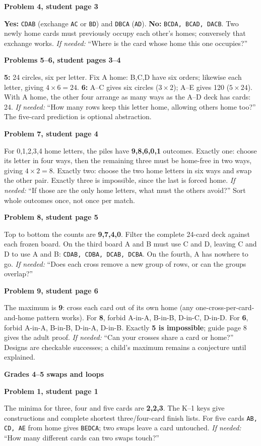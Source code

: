 \documentclass[11pt]{article}
\newcommand{\head}[1]{\par\textbf{\large #1}\par}
\newcommand{\sub}[1]{\par\textbf{#1}\par}
\newcommand{\row}[1]{\texttt{#1}}
\newcommand{\hint}[1]{\emph{If needed:} #1}
\begin{document}
\sub{Problem 4, student page 3}
\textbf{Yes:} \row{CDAB} (exchange \row{AC} or \row{BD}) and \row{DBCA} (\row{AD}). \textbf{No:} \row{BCDA, BCAD, DACB}. Two newly home cards must previously occupy each other's homes; conversely that exchange works. \hint{``Where is the card whose home this one occupies?''}

\sub{Problems 5--6, student pages 3--4}
\textbf{5:} 24 circles, six per letter. Fix A home: B,C,D have six orders; likewise each letter, giving $4\times6=24$. \textbf{6:} A--C gives six circles ($3\times2$); A--E gives 120 ($5\times24$). With A home, the other four arrange as many ways as the A--D deck has cards: 24. \hint{``How many rows keep this letter home, allowing others home too?''} The five-card prediction is optional abstraction.

\sub{Problem 7, student page 4}
For 0,1,2,3,4 home letters, the piles have \textbf{9,8,6,0,1} outcomes. Exactly one: choose its letter in four ways, then the remaining three must be home-free in two ways, giving $4\times2=8$. Exactly two: choose the two home letters in six ways and swap the other pair. Exactly three is impossible, since the last is forced home. \hint{``If those are the only home letters, what must the others avoid?''} Sort whole outcomes once, not once per match.

\sub{Problem 8, student page 5}
Top to bottom the counts are \textbf{9,7,4,0}. Filter the complete 24-card deck against each frozen board. On the third board A and B must use C and D, leaving C and D to use A and B: \row{CDAB, CDBA, DCAB, DCBA}. On the fourth, A has nowhere to go. \hint{``Does each cross remove a new group of rows, or can the groups overlap?''}

\sub{Problem 9, student page 6}
The maximum is \textbf{9}: cross each card out of its own home (any one-cross-per-card-and-home pattern works). For \textbf{8}, forbid A-in-A, B-in-B, D-in-C, D-in-D. For \textbf{6}, forbid A-in-A, B-in-B, D-in-A, D-in-B. Exactly \textbf{5 is impossible}; guide page 8 gives the adult proof. \hint{``Can your crosses share a card or home?''} Designs are checkable successes; a child's maximum remains a conjecture until explained.
\newpage
\head{Grades 4--5 swaps and loops}
\sub{Problem 1, student page 1}
The minima for three, four and five cards are \textbf{2,2,3}. The K--1 keys give constructions and complete shortest three/four-card finish lists. For five cards \row{AB, CD, AE} from home gives \row{BEDCA}; two swaps leave a card untouched. \hint{``How many different cards can two swaps touch?''}
\end{document}
